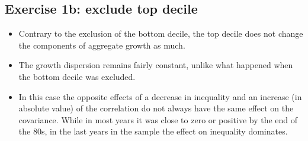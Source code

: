 \documentclass{article}
\begin{document}
\subsection*{Exercise 1b: exclude top decile}
\begin{figure}[H]
  \centering
  \hfill
  \caption*{}
\end{figure}

\begin{itemize}
    \item Contrary to the exclusion of the bottom decile, the top decile does not change the components of aggregate growth as much.
    \item The growth dispersion remains fairly constant, unlike what happened when the bottom decile was excluded. 
    \item In this case the opposite effects of a decrease in inequality and an increase (in absolute value) of the correlation do not always have the same effect on the covariance. While in most years it was close to zero or positive by the end of the 80s, in the last years in the sample the effect on inequality dominates.
\end{itemize}
\end{document}
